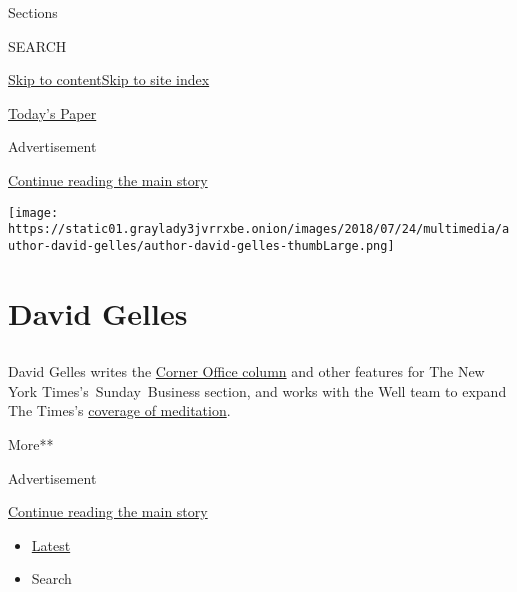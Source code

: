 Sections

SEARCH

\protect\hyperlink{site-content}{Skip to
content}\protect\hyperlink{site-index}{Skip to site index}

\href{https://myaccount.nytimes3xbfgragh.onion/auth/login?response_type=cookie\&client_id=vi}{}

\href{https://www.nytimes3xbfgragh.onion/section/todayspaper}{Today's
Paper}

Advertisement

\protect\hyperlink{after-top}{Continue reading the main story}

\texttt{[image: https://static01.graylady3jvrrxbe.onion/images/2018/07/24/multimedia/author-david-gelles/author-david-gelles-thumbLarge.png]}

\hypertarget{david-gelles}{%
\section{David Gelles}\label{david-gelles}}

\subsection{}

David Gelles writes the
\href{https://www.nytimes3xbfgragh.onion/column/corner-office}{Corner
Office column} and other features for The New York
Times's~Sunday~Business section, and works with the Well team to expand
The Times's
\href{https://www.nytimes3xbfgragh.onion/topic/subject/meditation}{coverage
of meditation}.

More**

Advertisement

\protect\hyperlink{after-mid1}{Continue reading the main story}

\begin{itemize}
\tightlist
\item
  \protect\hyperlink{stream-panel}{Latest}
\item
  Search
\end{itemize}

